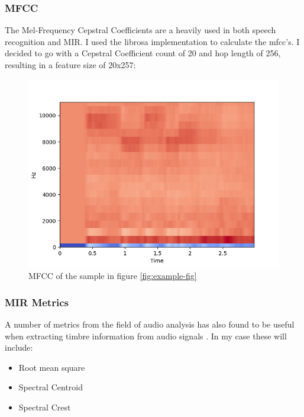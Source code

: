 \documentclass[11pt]{article}
\begin{document}
\subsubsection{MFCC}
\label{sec:org70aa9fd}

The Mel-Frequency Cepstral Coefficients are a heavily used in both speech recognition and MIR. \cite{medium,klustr,Racharla_2020,article}
I used the librosa implementation to calculate the mfcc's. I decided to go with a Cepstral Coefficient count of 20 and hop length of 256, resulting in a feature size of 20x257:

\begin{figure}[H]
\centering
\includegraphics[width=.7\linewidth]{./Figures/mfcc.png}
\caption{MFCC of the sample in figure \ref{fig:example-fig}}
\end{figure}

\subsubsection{MIR Metrics}
\label{sec:orgb3249b0}

A number of metrics from the field of audio analysis has also found to be useful when extracting timbre information from audio signals \cite{article,klustr}. In my case these will include:

\begin{itemize}
\item Root mean square
\end{itemize}

\begin{itemize}
\item Spectral Centroid
\end{itemize}

\begin{itemize}
\item Spectral Crest
\end{itemize}
\end{document}
